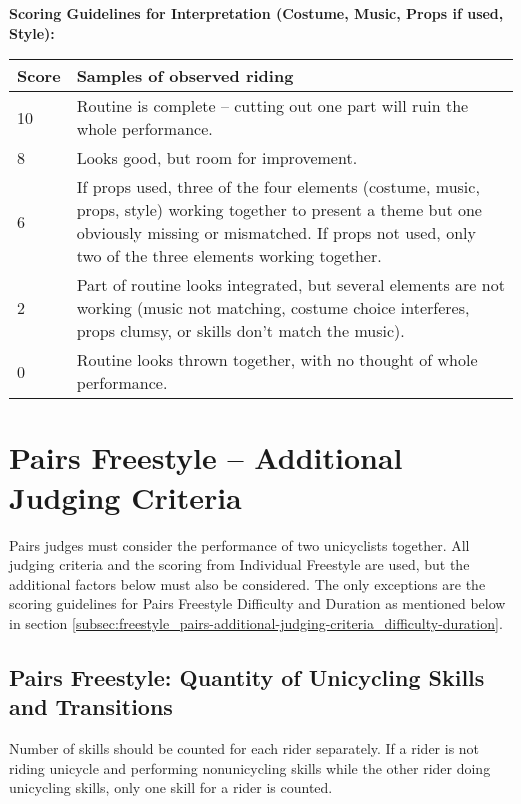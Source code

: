 \begin{minipage}{\textwidth}
\textbf{Scoring Guidelines for Interpretation (Costume, Music, Props if used, Style):} \\

\begin{tabular}{|l|p{12.5cm}|}
\hline
\textbf{Score} & \textbf{Samples of observed riding} \\
\hline
10 & Routine is complete – cutting out one part will ruin the whole performance. \\
\hline
8 & Looks good, but room for improvement. \\
\hline
6 & If props used, three of the four elements (costume, music, props, style) working together to present a theme but one obviously missing or mismatched.
If props not used, only two of the three elements working together. \\
\hline
2 & Part of routine looks integrated, but several elements are not working (music not matching, costume choice interferes, props clumsy, or skills don't match the music). \\
\hline
0 & Routine looks thrown together, with no thought of whole performance. \\
\hline
\end{tabular}
\end{minipage}

\section{Pairs Freestyle -- Additional Judging Criteria}
Pairs judges must consider the performance of two unicyclists together.
All judging criteria and the scoring from Individual Freestyle are used, but the additional factors below must also be considered.
The only exceptions are the scoring guidelines for Pairs Freestyle Difficulty and Duration as mentioned below in section \ref{subsec:freestyle_pairs-additional-judging-criteria_difficulty-duration}.

\subsection{Pairs Freestyle: Quantity of Unicycling Skills and Transitions \label{subsec:freestyle_pairs-additional-judging-criteria_quantity}}
Number of skills should be counted for each rider separately.
If a rider is not riding unicycle and performing nonunicycling skills while the other rider doing unicycling skills, only one skill for a rider is counted.

